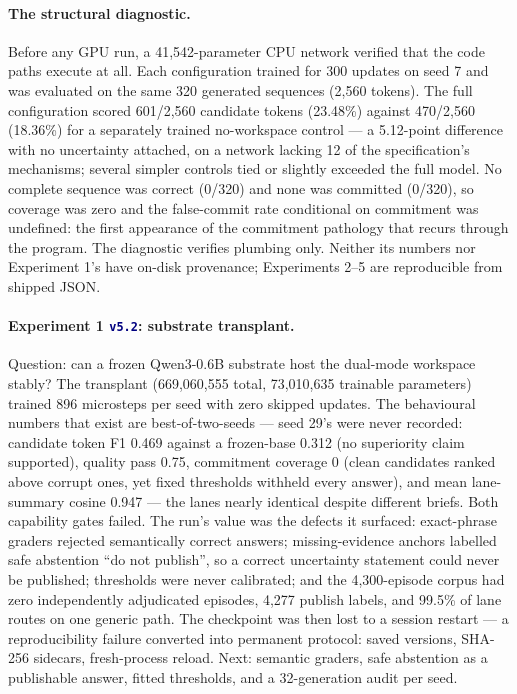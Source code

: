 \documentclass[10pt,a4paper]{article}
\newcommand{\studytag}[1]{\colorbox{navy!10}{\textcolor{navy}{\footnotesize\texttt{#1}}}}
\begin{document}
\paragraph{The structural diagnostic.}
Before any GPU run, a 41,542-parameter CPU network verified that the code paths execute at all. Each configuration trained for 300 updates on seed 7 and was evaluated on the same 320 generated sequences (2,560 tokens). The full configuration scored 601/2,560 candidate tokens (23.48\%) against 470/2,560 (18.36\%) for a separately trained no-workspace control --- a 5.12-point difference with no uncertainty attached, on a network lacking 12 of the specification's mechanisms; several simpler controls tied or slightly exceeded the full model. No complete sequence was correct (0/320) and none was committed (0/320), so coverage was zero and the false-commit rate conditional on commitment was undefined: the first appearance of the commitment pathology that recurs through the program. The diagnostic verifies plumbing only. Neither its numbers nor Experiment 1's have on-disk provenance; Experiments 2--5 are reproducible from shipped JSON.

\paragraph{Experiment 1 \studytag{v5.2}: substrate transplant.}
Question: can a frozen Qwen3-0.6B substrate host the dual-mode workspace stably? The transplant (669,060,555 total, 73,010,635 trainable parameters) trained 896 microsteps per seed with zero skipped updates. The behavioural numbers that exist are best-of-two-seeds --- seed 29's were never recorded: candidate token F1 0.469 against a frozen-base 0.312 (no superiority claim supported), quality pass 0.75, commitment coverage 0 (clean candidates ranked above corrupt ones, yet fixed thresholds withheld every answer), and mean lane-summary cosine 0.947 --- the lanes nearly identical despite different briefs. Both capability gates failed. The run's value was the defects it surfaced: exact-phrase graders rejected semantically correct answers; missing-evidence anchors labelled safe abstention ``do not publish'', so a correct uncertainty statement could never be published; thresholds were never calibrated; and the 4,300-episode corpus had zero independently adjudicated episodes, 4,277 publish labels, and 99.5\% of lane routes on one generic path. The checkpoint was then lost to a session restart --- a reproducibility failure converted into permanent protocol: saved versions, SHA-256 sidecars, fresh-process reload. Next: semantic graders, safe abstention as a publishable answer, fitted thresholds, and a 32-generation audit per seed.
\end{document}
